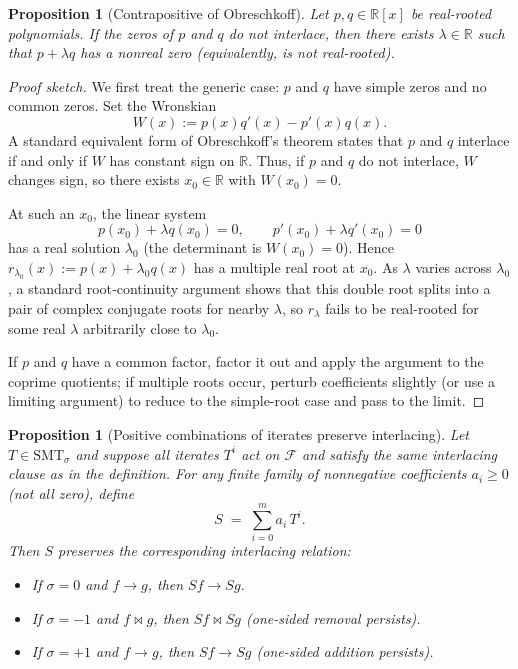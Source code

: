 \documentclass[11pt]{article}
\theoremstyle{breakdef}
\newtheorem{proposition}[theorem]{Proposition}
\begin{document}
\begin{proposition}[Contrapositive of Obreschkoff]
Let $p,q\in\mathbb{R}[x]$ be real-rooted polynomials. 
If the zeros of $p$ and $q$ do \emph{not} interlace, then there exists
$\lambda\in\mathbb{R}$ such that $p+\lambda q$ has a nonreal zero (equivalently,
is not real-rooted).
\end{proposition}

\begin{proof}[Proof sketch]
We first treat the generic case: $p$ and $q$ have simple zeros and no common zeros.
Set the Wronskian
\begin{equation}
W(x):=p(x)q'(x)-p'(x)q(x).
\end{equation}
A standard equivalent form of Obreschkoff’s theorem states that
$p$ and $q$ interlace if and only if $W$ has constant sign on $\mathbb{R}$.
Thus, if $p$ and $q$ do not interlace, $W$ changes sign, so there exists $x_0\in\mathbb{R}$ with $W(x_0)=0$.

At such an $x_0$, the linear system
\begin{equation}
p(x_0)+\lambda q(x_0)=0,\qquad p'(x_0)+\lambda q'(x_0)=0
\end{equation}
has a real solution $\lambda_0$ (the determinant is $W(x_0)=0$).
Hence $r_{\lambda_0}(x):=p(x)+\lambda_0 q(x)$ has a multiple real root at $x_0$.
As $\lambda$ varies across $\lambda_0$, a standard root‐continuity argument shows that this
double root splits into a pair of complex conjugate roots for nearby $\lambda$, so
$r_\lambda$ fails to be real-rooted for some real $\lambda$ arbitrarily close to $\lambda_0$.

If $p$ and $q$ have a common factor, factor it out and apply the argument to the coprime
quotients; if multiple roots occur, perturb coefficients slightly (or use a limiting
argument) to reduce to the simple-root case and pass to the limit.
\end{proof}

\begin{proposition}[Positive combinations of iterates preserve interlacing]
Let $T\in\mathrm{SMT}_\sigma$ and suppose all iterates $T^i$ act on $\mathcal{F}$ and satisfy the same
interlacing clause as in the definition. For any finite family of nonnegative coefficients $a_i\ge 0$ (not all zero),
define
\begin{equation}
S \;=\; \sum_{i=0}^m a_i\, T^i .
\end{equation}
Then $S$ preserves the corresponding interlacing relation:
\begin{itemize}
\item If $\sigma=0$ and $f\to g$, then $Sf\to Sg$.
\item If $\sigma=-1$ and $f\bowtie g$, then $Sf\bowtie Sg$ (one-sided removal persists).
\item If $\sigma=+1$ and $f\to g$, then $Sf\to Sg$ (one-sided addition persists).
\end{itemize}
\end{proposition}
\end{document}
